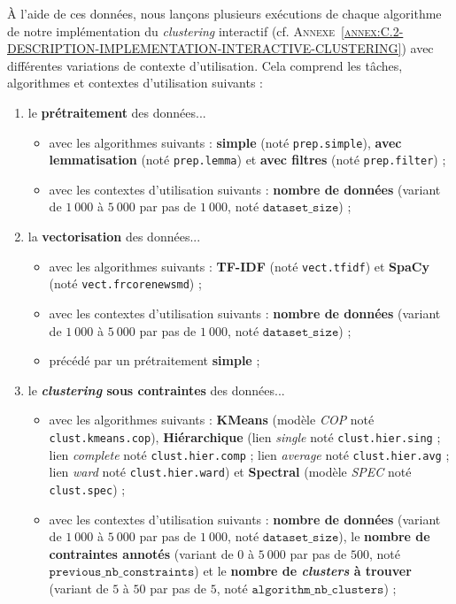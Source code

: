 			À l'aide de ces données, nous lançons plusieurs exécutions de chaque algorithme de notre implémentation du \textit{clustering} interactif (cf. \textsc{Annexe~\ref{annex:C.2-DESCRIPTION-IMPLEMENTATION-INTERACTIVE-CLUSTERING}}) avec différentes variations de contexte d'utilisation.
			Cela comprend les tâches, algorithmes et contextes d'utilisation suivants :
			\begin{enumerate}
				\item le \textbf{prétraitement} des données...
					\begin{itemize}
						\item avec les algorithmes suivants : \textbf{simple} (noté \texttt{prep.simple}), \textbf{avec lemmatisation} (noté \texttt{prep.lemma}) et \textbf{avec filtres} (noté \texttt{prep.filter}) ;
						\item avec les contextes d'utilisation suivants : \textbf{nombre de données} (variant de $1~000$ à $5~000$ par pas de $1~000$, noté $\texttt{dataset\_size}$) ;
					\end{itemize}
				\item la \textbf{vectorisation} des données...
					\begin{itemize}
						\item avec les algorithmes suivants : \textbf{TF-IDF} (noté \texttt{vect.tfidf}) et \textbf{SpaCy} (noté \texttt{vect.frcorenewsmd}) ;
						\item avec les contextes d'utilisation suivants : \textbf{nombre de données} (variant de $1~000$ à $5~000$ par pas de $1~000$, noté $\texttt{dataset\_size}$) ;
						\item précédé par un prétraitement \textbf{simple} ;
					\end{itemize}
				\item le \textbf{\textit{clustering} sous contraintes} des données...
					\begin{itemize}
						\item avec les algorithmes suivants : \textbf{KMeans} (modèle \textit{COP} noté \texttt{clust.kmeans.cop}), \textbf{Hiérarchique} (lien \textit{single} noté \texttt{clust.hier.sing} ; lien \textit{complete} noté \texttt{clust.hier.comp} ; lien \textit{average} noté \texttt{clust.hier.avg} ; lien \textit{ward} noté \texttt{clust.hier.ward}) et \textbf{Spectral} (modèle \textit{SPEC} noté \texttt{clust.spec}) ;
						\item avec les contextes d'utilisation suivants : \textbf{nombre de données} (variant de $1~000$ à $5~000$ par pas de $1~000$, noté $\texttt{dataset\_size}$), le \textbf{nombre de contraintes annotés} (variant de $0$ à $5~000$ par pas de $500$, noté $\texttt{previous\_nb\_constraints}$) et le \textbf{nombre de \textit{clusters} à trouver} (variant de $5$ à $50$ par pas de $5$, noté $\texttt{algorithm\_nb\_clusters}$) ;

\end{itemize}
\end{enumerate}
